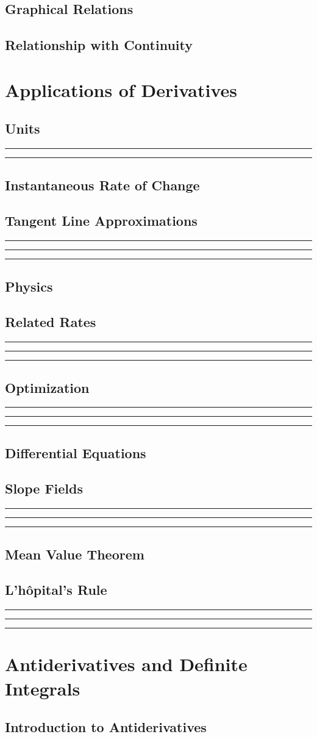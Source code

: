 \documentclass{article}
\newcommand{\newMidline}{\noindent\rule[0.5ex]{\linewidth}{1pt}}
\newcommand{\newchapter}[2]
{
	\subsection{#1}\newMidline\newMidline\newMidline\vspace{.125in}
}
\begin{document}
\subsection{Graphical Relations} 
\subsection{Relationship with Continuity} 
\newpage
\section{Applications of Derivatives}
\subsection{Units}\newMidline\newMidline
\subsection{Instantaneous Rate of Change}
\newpage
\newchapter{Tangent Line Approximations}{TangentLineApproximations}
\subsection{Physics}
\newchapter{Related Rates}{DerivativeRelatedRates}
\newchapter{Optimization}{Optimization}
\subsection{Differential Equations}
\newchapter{Slope Fields}{SlopeFields}
\subsection{Mean Value Theorem}
\newchapter{L'h\^{o}pital's Rule}{LhospitalsRule}
\newpage
\section{Antiderivatives and Definite Integrals}
\subsection{Introduction to Antiderivatives}
\end{document}
